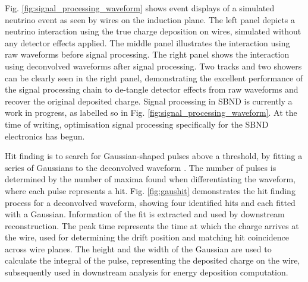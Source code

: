 Fig. \ref{fig:signal_processing_waveform} shows event displays of a simulated neutrino event as seen by wires on the induction plane.
The left panel depicts a neutrino interaction using the true charge deposition on wires, simulated without any detector effects applied.
The middle panel illustrates the interaction using raw waveforms before signal processing.
The right panel shows the interaction using deconvolved waveforms after signal processing.
Two tracks and two showers can be clearly seen in the right panel, demonstrating the excellent performance of the signal processing chain to de-tangle detector effects from raw waveforms and recover the original deposited charge.
Signal processing in SBND is currently a work in progress, as labelled so in Fig. \ref{fig:signal_processing_waveform}.
At the time of writing, optimisation signal processing specifically for the SBND electronics has begun.



Hit finding is to search for Gaussian-shaped pulses above a threshold, by fitting a series of Gaussians to the deconvolved waveform  \cite{gaushitfinder}.         
The number of pulses is determined by the number of maxima found when differentiating the waveform, where each pulse represents a hit. 
Fig. \ref{fig:gaushit} demonstrates the hit finding process for a deconvolved waveform, showing four identified hits and each fitted with a Gaussian.
Information of the fit is extracted and used by downstream reconstruction.
The peak time represents the time at which the charge arrives at the wire, used for determining the drift position and matching hit coincidence across wire planes.
The height and the width of the Gaussian are used to calculate the integral of the pulse, representing the deposited charge on the wire, subsequently used in downstream analysis for energy deposition computation.

